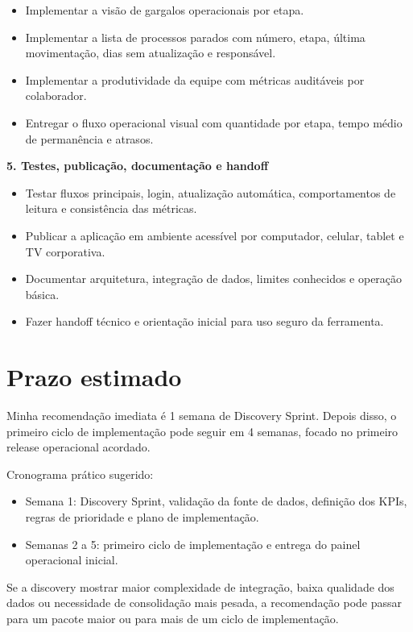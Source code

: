 \documentclass[11pt,a4paper]{article}
\begin{document}
\begin{itemize}
\item Implementar a visão de gargalos operacionais por etapa.
\item Implementar a lista de processos parados com número, etapa, última movimentação, dias sem atualização e responsável.
\item Implementar a produtividade da equipe com métricas auditáveis por colaborador.
\item Entregar o fluxo operacional visual com quantidade por etapa, tempo médio de permanência e atrasos.
\end{itemize}

\textbf{5. Testes, publicação, documentação e handoff}\par

\begin{itemize}
\item Testar fluxos principais, login, atualização automática, comportamentos de leitura e consistência das métricas.
\item Publicar a aplicação em ambiente acessível por computador, celular, tablet e TV corporativa.
\item Documentar arquitetura, integração de dados, limites conhecidos e operação básica.
\item Fazer handoff técnico e orientação inicial para uso seguro da ferramenta.
\end{itemize}

\section*{Prazo estimado}

Minha recomendação imediata é 1 semana de Discovery Sprint. Depois disso, o primeiro ciclo de implementação pode seguir em 4 semanas, focado no primeiro release operacional acordado.\par

Cronograma prático sugerido:\par

\begin{itemize}
\item Semana 1: Discovery Sprint, validação da fonte de dados, definição dos KPIs, regras de prioridade e plano de implementação.
\item Semanas 2 a 5: primeiro ciclo de implementação e entrega do painel operacional inicial.
\end{itemize}

Se a discovery mostrar maior complexidade de integração, baixa qualidade dos dados ou necessidade de consolidação mais pesada, a recomendação pode passar para um pacote maior ou para mais de um ciclo de implementação.\par
\end{document}
